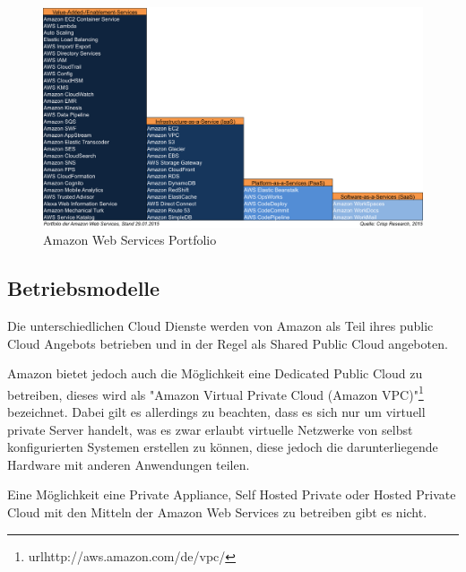 \begin{figure}
	\centering
	\includegraphics[width=0.8\linewidth]{images/Crisp-AWS-Portfolio_201501291}
	\caption{Amazon Web Services Portfolio }
	\label{fig:amazon}
\end{figure}

\subsection{Betriebsmodelle}
\label{sec_amazon_deployment}
Die unterschiedlichen Cloud Dienste werden von Amazon als Teil ihres public Cloud Angebots betrieben und in der Regel als Shared Public Cloud angeboten.

Amazon bietet jedoch auch die Möglichkeit eine Dedicated Public Cloud zu betreiben, dieses wird als "Amazon Virtual Private Cloud (Amazon VPC)"\footnote{url{http://aws.amazon.com/de/vpc/}} bezeichnet. Dabei gilt es allerdings zu beachten, dass es sich nur um virtuell private Server handelt, was es zwar erlaubt virtuelle Netzwerke von selbst konfigurierten  Systemen erstellen zu können, diese jedoch die darunterliegende Hardware mit anderen Anwendungen teilen. 

Eine Möglichkeit eine Private Appliance, Self Hosted Private oder Hosted Private Cloud mit den Mitteln der Amazon Web Services zu betreiben gibt es nicht. \cite{amazonPrivate}